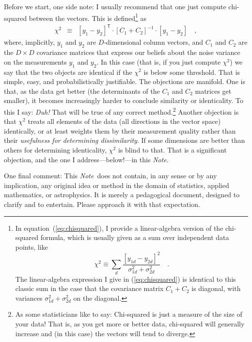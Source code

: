 \documentclass[12pt,letterpaper]{article}
\newcommand{\documentname}{\textsl{Note}}
\newcommand{\equationname}{equation}
\newcommand{\tra}[1]{{#1}^{\mathsf{T}}}
\newcommand{\inv}[1]{{#1}^{-1}}
\begin{document}
Before we start, one side note: I usually recommend that one just
compute chi-squared between the vectors. This is defined\footnote{In
  \equationname~(\ref{eq:chisquared}), I provide a linear-algebra
  version of the chi-squared formula, which is usually given as a sum
  over independent data points, like
  \[\chi^2\equiv\sum_d\frac{[y_{1d}-y_{2d}]^2}{\sigma_{1d}^2+\sigma_{2d}^2} \quad .\]
  The linear-algebra expression I give in (\ref{eq:chisquared}) is
  identical to this classic sum in the case that the covariance matrix
  $C_1 + C_2$ is diagonal, with variances $\sigma_{1d}^2+\sigma_{2d}^2$ on the
  diagonal.} as
\begin{eqnarray}
\chi^2 &\equiv&
\tra{[y_1 - y_2]}\cdot\inv{[C_1 + C_2]}\cdot [y_1 - y_2] \quad ,
\label{eq:chisquared}
\end{eqnarray}
where, implicitly, $y_1$ and $y_2$ are $D$-dimensional column vectors,
and $C_1$ and $C_2$ are the $D\times D$ covariance matrices that
express our beliefs about the noise variance on the measurements $y_1$
and $y_2$. In this case (that is, if you just compute $\chi^2$) we say
that the two objects are identical if the $\chi^2$ is below some
threshold. That is simple, easy, and probabilistically
justifiable. The objections are manifold. One is that, as the data get
better (the determinants of the $C_1$ and $C_2$ matrices get smaller),
it becomes increasingly harder to conclude similarity or
identicality. To this I say: \emph{Duh!} That will be true of any
correct method.\footnote{%
  As some statisticians like to say: Chi-squared is just a measure of
  the size of your data! That is, as you get more or better data,
  chi-squared will generally increase and (in this case) the vectors will
  tend to diverge.}
Another objection is that $\chi^2$ treats all elements
of the data (all directions in the vector space) identically, or at
least weights them by their measurement quality rather than their
\emph{usefulness for determining dissimilarity}. If some dimensions
are better than others for determining identicality, $\chi^2$ is blind
to that. That is a significant objection, and the one I
address---below!---in this \documentname.

One final comment: This \documentname\ does not contain,
in any sense or by any implication, any original idea or method in the
domain of statistics, applied mathematics, or astrophysics. It is
merely a pedagogical document, designed to clarify and to entertain.
Please approach it with that expectation.
\end{document}
